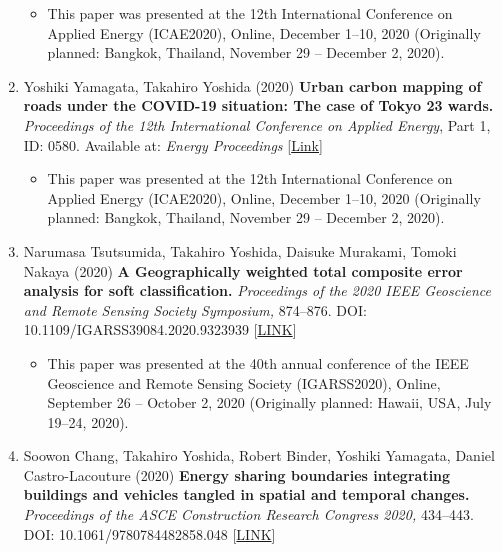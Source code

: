 \documentclass[]{book}
\providecommand{\tightlist}{%
  \setlength{\itemsep}{0pt}\setlength{\parskip}{0pt}}
\begin{document}
\begin{enumerate}
  \begin{itemize}
  \tightlist
  \item
    This paper was presented at the 12th International Conference on Applied Energy (ICAE2020), Online, December 1--10, 2020 (Originally planned: Bangkok, Thailand, November 29 -- December 2, 2020).
  \end{itemize}
\item
  Yoshiki Yamagata, Takahiro Yoshida (2020)
  \textbf{Urban carbon mapping of roads under the COVID-19 situation: The case of Tokyo 23 wards.}
  \emph{Proceedings of the 12th International Conference on Applied Energy}, Part 1, ID: 0580.
  Available at: \emph{Energy Proceedings} {[}\href{https://www.energy-proceedings.org/urban-carbon-mapping-of-roads-under-the-covid-19-situation\%252525252525252525252525252525252525252525252525252525252525252525253A-the-case-of-tokyo-23-wards/}{Link}{]}

  \begin{itemize}
  \tightlist
  \item
    This paper was presented at the 12th International Conference on Applied Energy (ICAE2020), Online, December 1--10, 2020 (Originally planned: Bangkok, Thailand, November 29 -- December 2, 2020).
  \end{itemize}
\item
  Narumasa Tsutsumida, Takahiro Yoshida, Daisuke Murakami, Tomoki Nakaya (2020)
  \textbf{A Geographically weighted total composite error analysis for soft classification.}
  \emph{Proceedings of the 2020 IEEE Geoscience and Remote Sensing Society Symposium,} 874--876.
  DOI: 10.1109/IGARSS39084.2020.9323939 {[}\href{https://ieeexplore.ieee.org/document/9323939}{LINK}{]}

  \begin{itemize}
  \tightlist
  \item
    This paper was presented at the 40th annual conference of the IEEE Geoscience and Remote Sensing Society (IGARSS2020), Online, September 26 -- October 2, 2020 (Originally planned: Hawaii, USA, July 19--24, 2020).
  \end{itemize}
\item
  Soowon Chang, Takahiro Yoshida, Robert Binder, Yoshiki Yamagata, Daniel Castro-Lacouture (2020)
  \textbf{Energy sharing boundaries integrating buildings and vehicles tangled in spatial and temporal changes.}
  \emph{Proceedings of the ASCE Construction Research Congress 2020,} 434--443.
  DOI: 10.1061/9780784482858.048 {[}\href{https://ascelibrary.org/doi/10.1061/9780784482858.048}{LINK}{]}


\end{enumerate}
\end{document}
